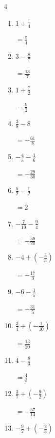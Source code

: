 \begin{multicols}{4}
\begin{enumerate}
  \item $\displaystyle 1 + \frac{1}{4}$

        $\displaystyle =\frac{5}{4}$

  \item $\displaystyle 3 - \frac{8}{7}$

        $\displaystyle =\frac{13}{7}$

  \item $\displaystyle 1 + \frac{7}{2}$

        $\displaystyle =\frac{9}{2}$

  \item $\displaystyle \frac{3}{8} - 8$

        $\displaystyle =-\frac{61}{8}$

  \item $\displaystyle -\frac{4}{5} - \frac{1}{6}$

        $\displaystyle =-\frac{29}{30}$

  \item $\displaystyle \frac{5}{2} - \frac{1}{2}$

        $\displaystyle =2$

\columnbreak %

  \item $\displaystyle -\frac{7}{10} - \frac{9}{4}$

        $\displaystyle =-\frac{59}{20}$

  \item $\displaystyle -4 + \left(-\frac{5}{3}\right)$

        $\displaystyle =-\frac{17}{3}$

  \item $\displaystyle -6 - \frac{1}{5}$

        $\displaystyle =-\frac{31}{5}$

  \item $\displaystyle \frac{3}{4} + \left(-\frac{1}{10}\right)$

        $\displaystyle =\frac{13}{20}$

  \item $\displaystyle 4 - \frac{8}{3}$

        $\displaystyle =\frac{4}{3}$

  \item $\displaystyle \frac{3}{7} + \left(-\frac{9}{2}\right)$

        $\displaystyle =-\frac{57}{14}$

  \item $\displaystyle -\frac{9}{2} + \left(-\frac{2}{3}\right)$


\end{enumerate}
\end{multicols}
